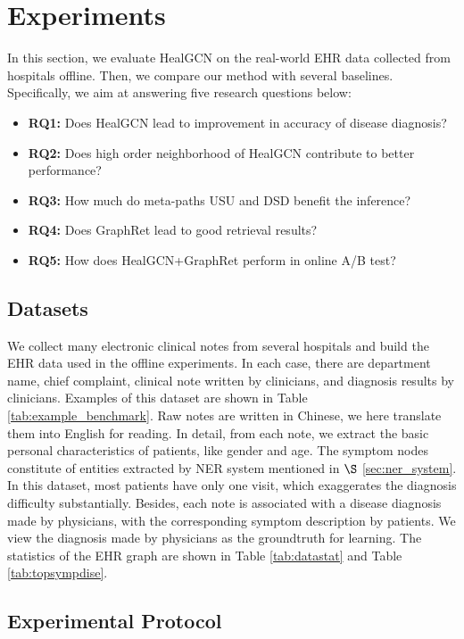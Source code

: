 \documentclass[sigconf]{acmart}
\begin{document}
\section{Experiments}
In this section, we evaluate HealGCN on the real-world EHR data collected from hospitals offline. Then, we compare our method with several baselines. Specifically, we aim at answering five research questions below:
\begin{itemize}[leftmargin=*, itemsep=0pt, labelsep=5pt]
\item \textbf{RQ1:} Does HealGCN lead to improvement in accuracy of disease diagnosis?
\item \textbf{RQ2:} Does high order neighborhood of HealGCN contribute to better performance?
\item \textbf{RQ3:} How much do meta-paths USU and DSD benefit the inference?
\item \textbf{RQ4:} Does GraphRet lead to good retrieval results?
\item \textbf{RQ5:} How does HealGCN+GraphRet perform in online A/B test?
\end{itemize}

\subsection{Datasets}
We collect many electronic clinical notes from several hospitals and build  the EHR data used in the offline experiments. In each case, there are department name, chief complaint, clinical note written by clinicians, and diagnosis results by clinicians. Examples of this dataset are shown in Table \ref{tab:example_benchmark}. Raw notes are written in Chinese, we here translate them into English for reading. In detail, from each note, we extract the basic personal characteristics of patients, like gender and age. The symptom nodes constitute of entities extracted by NER system mentioned in $\S$ \ref{sec:ner_system}. In this dataset, most patients have only one visit, which exaggerates the diagnosis difficulty substantially. Besides, each note is associated with a disease diagnosis made by physicians, with the corresponding symptom description by patients. We view the diagnosis made by physicians as the groundtruth for learning. The statistics of the EHR graph are shown in Table \ref{tab:datastat} and Table \ref{tab:topsympdise}.

\subsection{Experimental Protocol}
\end{document}
